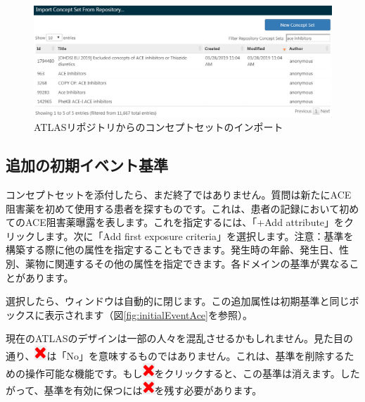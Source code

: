 \documentclass[
  11pt]{book}
\makeatletter
\newenvironment{kframe}{%
\medskip{}
\setlength{\fboxsep}{.8em}
 \def\at@end@of@kframe{}%
 \ifinner\ifhmode%
  \def\at@end@of@kframe{\end{minipage}}%
  \begin{minipage}{\columnwidth}%
 \fi\fi%
 \def\FrameCommand##1{\hskip\@totalleftmargin \hskip-\fboxsep
 \colorbox{myShadeColor}{##1}\hskip-\fboxsep
     \hskip-\linewidth \hskip-\@totalleftmargin \hskip\columnwidth}%
 \MakeFramed {\advance\hsize-\width
   \@totalleftmargin\z@ \linewidth\hsize
   \@setminipage}}%
 {\par\unskip\endMakeFramed%
 \at@end@of@kframe}
\newenvironment{rmdblock}[1]
  {
  \begin{itemize}
  \renewcommand{\labelitemi}{
    \raisebox{-.7\height}[0pt][0pt]{
      {\setkeys{Gin}{width=3em,keepaspectratio}\texttt{[image: images/\#1]}}
    }
  }
  \setlength{\fboxsep}{1em}
  \begin{kframe}
  \item
  }
  {
  \end{kframe}
  \end{itemize}
  }
\newenvironment{rmdimportant}
  {\begin{rmdblock}{important}}
  {\end{rmdblock}}
\theoremstyle{definition}
\theoremstyle{definition}
\theoremstyle{definition}
\theoremstyle{definition}
\theoremstyle{remark}
\makeatother
\begin{document}
\begin{figure}

{\centering \includegraphics[width=1\linewidth]{images/Cohorts/ATLAS-findingyourconcept} 

}

\caption{ATLASリポジトリからのコンセプトセットのインポート}\label{fig:ATLASfindyourconcept}
\end{figure}

\subsection{追加の初期イベント基準}\label{ux8ffdux52a0ux306eux521dux671fux30a4ux30d9ux30f3ux30c8ux57faux6e96}

コンセプトセットを添付したら、まだ終了ではありません。質問は新たにACE阻害薬を初めて使用する患者を探すものです。これは、患者の記録において初めてのACE阻害薬曝露を表します。これを指定するには、「+Add attribute」をクリックします。次に「Add first exposure criteria」を選択します。注意：基準を構築する際に他の属性を指定することもできます。発生時の年齢、発生日、性別、薬物に関連するその他の属性を指定できます。各ドメインの基準が異なることがあります。

選択したら、ウィンドウは自動的に閉じます。この追加属性は初期基準と同じボックスに表示されます（図\ref{fig:initialEventAce}を参照）。

\begin{rmdimportant}
現在のATLASのデザインは一部の人々を混乱させるかもしれません。見た目の通り、\includegraphics{images/Cohorts/redX.png}は「No」を意味するものではありません。これは、基準を削除するための操作可能な機能です。もし\includegraphics{images/Cohorts/redX.png}をクリックすると、この基準は消えます。したがって、基準を有効に保つには\includegraphics{images/Cohorts/redX.png}を残す必要があります。
\end{rmdimportant}
\end{document}
